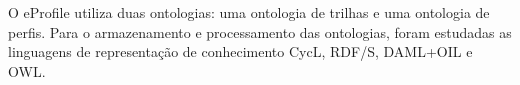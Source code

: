 O eProfile utiliza duas ontologias: uma ontologia de trilhas e uma ontologia de perfis. Para o armazenamento e processamento das ontologias, foram estudadas as linguagens de representação de conhecimento CycL\cite{lenat89}, RDF/S\cite{rdfs}, DAML+OIL\cite{daconta03} e OWL\cite{daconta03}.

